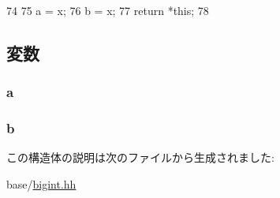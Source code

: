 \begin{DoxyCode}
74     {
75         a = x;
76         b = x;
77         return *this;
78     }
\end{DoxyCode}


\subsection{変数}
\hypertarget{structm5__twin32__t_a0a0390ed59a97feb6783f87db4086a7c}{
\subsubsection[{a}]{ {\bf a}}}
\label{structm5__twin32__t_a0a0390ed59a97feb6783f87db4086a7c}
\hypertarget{structm5__twin32__t_a2826644ea978cb49c4ee809b55e128d7}{
\subsubsection[{b}]{ {\bf b}}}
\label{structm5__twin32__t_a2826644ea978cb49c4ee809b55e128d7}


この構造体の説明は次のファイルから生成されました:\begin{DoxyCompactItemize}
\item 
base/\hyperlink{bigint_8hh}{bigint.hh}\end{DoxyCompactItemize}
